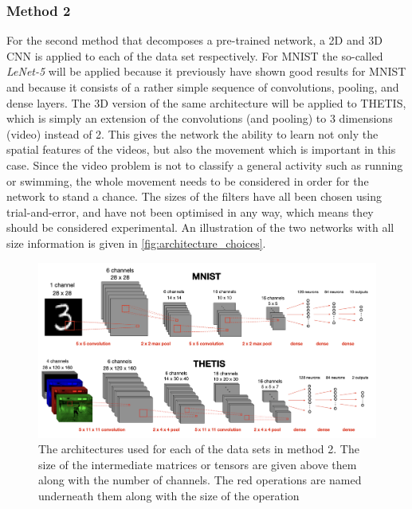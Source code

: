 \subsubsection{Method 2}
For the second method that decomposes a pre-trained network, a 2D and 3D CNN is applied to each of the data set respectively. For MNIST the so-called \textit{LeNet-5} will be applied because it previously have shown good results for MNIST\cite{MNIST} and because it consists of a rather simple sequence of convolutions, pooling, and dense layers. The 3D version of the same architecture will be applied to THETIS, which is simply an extension of the convolutions (and pooling) to 3 dimensions (video) instead of 2. This gives the network the ability to learn not only the spatial features of the videos, but also the movement which is important in this case. Since the video problem is not to classify a general activity such as running or swimming, the whole movement needs to be considered in order for the network to stand a chance. The sizes of the filters have all been chosen using trial-and-error, and have not been optimised in any way, which means they should be considered experimental. An illustration of the two networks with all size information is given in \autoref{fig:architecture_choices}.
\begin{figure}
    \centering
    \captionsetup{width=.95\linewidth}
    \includegraphics[width=\linewidth]{Pics/05_methodology/architecture_choice_illustration.png}
    \caption{The architectures used for each of the data sets in method 2. The size of the intermediate matrices or tensors are given above them along with the number of channels. The red operations are named underneath them along with the size of the operation}
    \label{fig:architecture_choices}
\end{figure}

